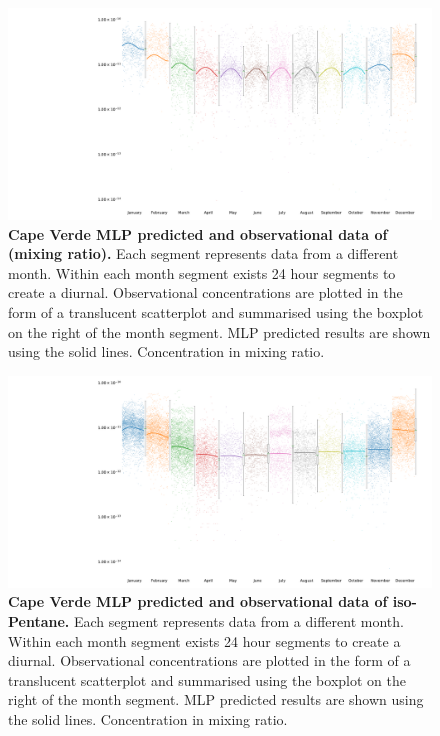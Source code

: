 \begin{figure}[H]
     \centering
         \includegraphics[width=.90\textheight,angle =90,trim={8cm 0 0 0}]{figures_c3/mlpregressor/CVNOX_CapeVerde/NO2.pdf}
        \caption{\textbf{Cape Verde MLP predicted and observational data of  (mixing ratio).} Each segment represents data from a different month. Within each month segment exists 24 hour segments to create a diurnal. Observational concentrations are plotted in the form of a translucent scatterplot and summarised using the boxplot on the right of the month segment. MLP predicted results are shown using the solid lines. Concentration in mixing ratio.}
        \label{fig:mlpno2}
\end{figure}

\begin{figure}[H]
     \centering
         \includegraphics[width=.90\textheight,angle =90,trim={8cm 0 0 0}]{figures_c3/mlpregressor/CVNOX_CapeVerde/ISO_PENTANE.pdf}
        \caption{\textbf{Cape Verde MLP predicted and observational data of iso-Pentane.} Each segment represents data from a different month. Within each month segment exists 24 hour segments to create a diurnal. Observational concentrations are plotted in the form of a translucent scatterplot and summarised using the boxplot on the right of the month segment. MLP predicted results are shown using the solid lines. Concentration in mixing ratio. }
        \label{fig:mlpisopentane}
\end{figure}


